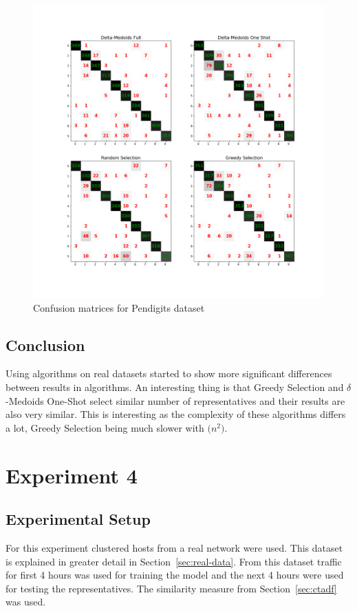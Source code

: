 \documentclass[thesis=B,english]{FITthesis}[2012/10/20]
\begin{document}
\begin{figure}[H]
   \includegraphics[width=\linewidth]{img/exp3_pendigits.png}
  \caption{Confusion matrices for Pendigits dataset}
  \label{img:exp3_pendigits}
\end{figure}

\subsection{Conclusion}
Using algorithms on real datasets started to show more significant differences between results in algorithms.
An interesting thing is that Greedy Selection and $\delta$-Medoids One-Shot select similar number of representatives and their results are also very similar.
This is interesting as the complexity of these algorithms differs a lot, Greedy Selection being much slower with $\mathcal(n^2)$. 

\section{Experiment 4}\label{sec:exp4}


\subsection{Experimental Setup}
For this experiment clustered hosts from a real network were used.
This dataset is explained in greater detail in Section~\ref{sec:real-data}.
From this dataset traffic for first 4 hours was used for training the model and the next 4 hours were used for testing the representatives.
The similarity measure from Section~\ref{sec:ctadf} was used.
\end{document}
